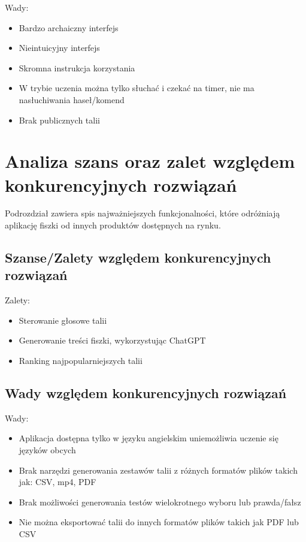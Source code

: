 Wady:
\begin{itemize}
    \item Bardzo archaiczny interfejs
    \item Nieintuicyjny interfejs
    \item Skromna instrukcja korzystania
    \item W trybie uczenia można tylko słuchać i czekać na timer, nie ma nasłuchiwania haseł/komend
    \item Brak publicznych talii
\end{itemize}

\section{Analiza szans oraz zalet względem konkurencyjnych rozwiązań}

Podrozdział zawiera spis najważniejszych funkcjonalności, które odróżniają aplikację fiszki od innych produktów dostępnych na rynku.

\subsection{Szanse/Zalety względem konkurencyjnych rozwiązań}

Zalety:
\begin{itemize}
    \item Sterowanie głosowe talii
    \item Generowanie treści fiszki, wykorzystując ChatGPT
    \item Ranking najpopularniejszych talii
\end{itemize}

\subsection{Wady względem konkurencyjnych rozwiązań}

Wady:
\begin{itemize}
    \item Aplikacja dostępna tylko w języku angielskim uniemożliwia uczenie się języków obcych
    \item Brak narzędzi generowania zestawów talii z różnych formatów plików takich jak: CSV, mp4, PDF
    \item Brak możliwości generowania testów wielokrotnego wyboru lub prawda/fałsz
    \item Nie można eksportować talii do innych formatów plików takich jak PDF lub CSV
\end{itemize}

